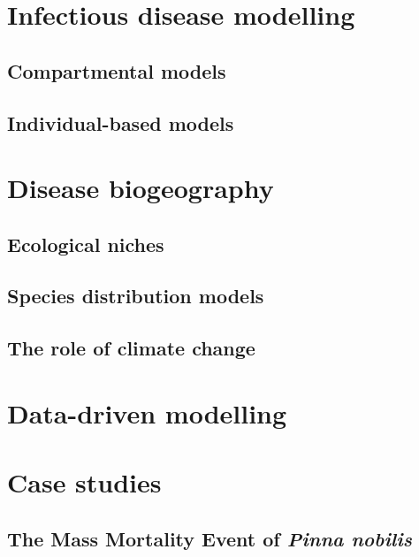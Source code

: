
\section{\label{sec:Infectious disease modelling} Infectious
  disease modelling}

\subsection{\label{sec:Compartmental models} Compartmental models}

\subsection{\label{sec:Individual-based models} Individual-based models}

\section{\label{sec:Disease biogeography} Disease biogeography}

\subsection{\label{sec:Ecological niches} Ecological niches}


\subsection{\label{sec:Species distribution models} Species distribution
  models}

\subsection{\label{sec:The role of climate change} The role of climate change}

\section{\label{sec:Data-driven modelling} Data-driven modelling}

\section{\label{sec:Case studies} Case studies}

\subsection{\label{sec:The Mass Mortality Event of Pinna nobilis} The Mass
  Mortality Event of \textit{Pinna nobilis}}

